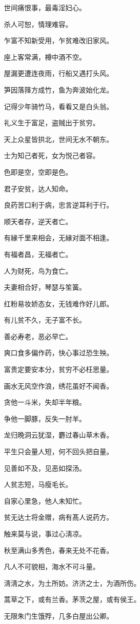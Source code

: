 \documentclass[12pt,oneside]{book}
\begin{document}
世间痛恨事，最毒淫妇心。

杀人可恕，情理难容。

乍富不知新受用，乍贫难改旧家风。

座上客常满，樽中酒不空。

屋漏更遭连夜雨，行船又遇打头风。

笋因落箨方成竹，鱼为奔波始化龙。

记得少年骑竹马，看看又是白头翁。

礼义生于富足，盗贼出于贫穷。

天上众星皆拱北，世间无水不朝东。

士为知己者死，女为悦己者容。

色即是空，空即是色。

君子安贫，达人知命。

良药苦口利于病，忠言逆耳利于行。

顺天者存，逆天者亡。

有縁千里来相会，无縁对面不相逢。

有福者昌，无福者亡。

人为财死，鸟为食亡。

夫妻相合好，琴瑟与笙簧。

红粉易妆娇态女，无钱难作好儿郎。

有儿贫不久，无子富不长。

善必寿老，恶必早亡。

爽口食多偏作药，快心事过恐生殃。

富贵定要安本分，贫穷不必枉思量。

画水无风空作浪，绣花虽好不闻香。

贪他一斗米，失却半年粮。

争他一脚豚，反失一肘羊。

龙归晩洞云犹湿，麝过春山草木香。

平生只会量人短，何不回头把自量。

见善如不及，见恶如探汤。

人贫志短，马瘦毛长。

自家心里急，他人未知忙。

贫无达士将金赠，病有髙人说药方。

触来莫与说，事过心淸凉。

秋至满山多秀色，春来无处不花香。

凡人不可貌相，海水不可斗量。

淸淸之水，为土所妨。济济之士，为酒所伤。

蒿草之下，或有兰香。茅茨之屋，或有侯王。

无限朱门生饿殍，几多白屋出公卿。
\end{document}
